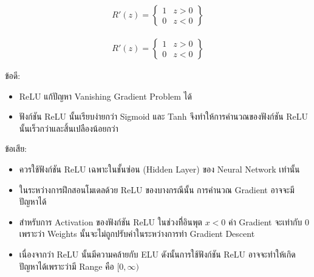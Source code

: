 \begin{itemize}
\begin{figure}[H]
\begin{subfigure}{0.5\textwidth}
            \caption{%
                \begin{equation}
                    \begin{split}R'(z) = \begin{Bmatrix} 1 & z>0 \\
                        0 & z<0 \end{Bmatrix}\end{split}
                \end{equation}
            }
            \label{fig:actfunc_relu_der}
        \end{subfigure}
    \end{figure}

    ข้อดี:
    \begin{itemize}
        \item ReLU แก้ปัญหา Vanishing Gradient Problem ได้
        
        \item ฟังก์ชัน ReLU นั้นเรียบง่ายกว่า Sigmoid และ Tanh จึงทำให้การคำนวณของฟังก์ชัน ReLU นั้นเร็วกว่าและสิ้นเปลืองน้อยกว่า 
    \end{itemize}
    ข้อเสีย:
    \begin{itemize}
        \item ควรใช้ฟังก์ชัน ReLU เฉพาะในชั้นซ่อน (Hidden Layer) ของ Neural Network เท่านั้น
        
        \item ในระหว่างการฝึกสอนโมเดลด้วย ReLU ของบางกรณีนั้น การคำนวณ Gradient อาจจะมีปัญหาได้
        
        \item สำหรับการ Activation ของฟังก์ชัน ReLU ในช่วงที่ิอินพุต $x < 0$ ค่า Gradient จะเท่ากับ 0 เพราะว่า Weights 
        นั้นจะไม่ถูกปรับค่าในระหว่างการทำ Gradient Descent

        \item เนื่องจากว่า ReLU นั้นมีความคล้ายกับ ELU ดังนั้นการใช้ฟังก์ชัน ReLU อาจจะทำให้เกิดปัญหาได้เพราะว่ามี Range คือ 
        $[0,\infty)$
    \end{itemize}


\end{itemize}
